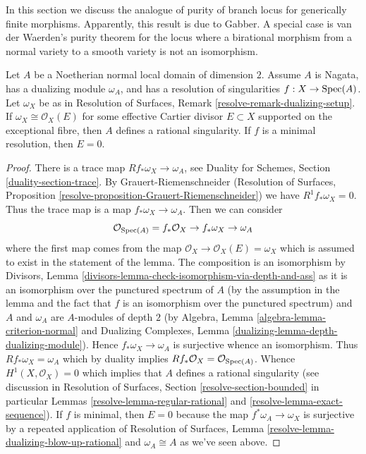 \noindent
In this section we discuss the analogue of purity of branch locus for
generically finite morphisms. Apparently, this result is due to Gabber.
A special case is van der Waerden's purity theorem for the locus where
a birational morphism from a normal variety to a smooth variety is not
an isomorphism.

\begin{lemma}
\label{lemma-characterize-rational-singularity}
Let $A$ be a Noetherian normal local domain of dimension $2$.
Assume $A$ is Nagata, has a dualizing module $\omega_A$, and has a
resolution of singularities $f : X \to \mathop{\mathrm{Spec}}(A)$.
Let $\omega_X$ be as in Resolution of Surfaces,
Remark \ref{resolve-remark-dualizing-setup}.
If $\omega_X \cong \mathcal{O}_X(E)$ for some effective
Cartier divisor $E \subset X$ supported on the exceptional
fibre, then $A$ defines a rational singularity.
If $f$ is a minimal resolution, then $E = 0$.
\end{lemma}

\begin{proof}
There is a trace map $Rf_*\omega_X \to \omega_A$, see
Duality for Schemes, Section \ref{duality-section-trace}.
By Grauert-Riemenschneider
(Resolution of Surfaces,
Proposition \ref{resolve-proposition-Grauert-Riemenschneider})
we have $R^1f_*\omega_X = 0$.
Thus the trace map is a map $f_*\omega_X \to \omega_A$.
Then we can consider
$$
\mathcal{O}_{\mathop{\mathrm{Spec}}(A)} = f_*\mathcal{O}_X \to f_*\omega_X \to \omega_A
$$
where the first map comes from the map
$\mathcal{O}_X \to \mathcal{O}_X(E) = \omega_X$ which is
assumed to exist in the statement of the lemma.
The composition is an isomorphism by Divisors, Lemma
\ref{divisors-lemma-check-isomorphism-via-depth-and-ass}
as it is an isomorphism over the punctured spectrum of $A$
(by the assumption in the lemma and the fact that $f$ is an isomorphism
over the punctured spectrum) and $A$ and $\omega_A$
are $A$-modules of depth $2$ (by
Algebra, Lemma \ref{algebra-lemma-criterion-normal} and
Dualizing Complexes, Lemma \ref{dualizing-lemma-depth-dualizing-module}).
Hence $f_*\omega_X \to \omega_A$ is surjective whence an isomorphism.
Thus $Rf_*\omega_X = \omega_A$ which by duality implies
$Rf_*\mathcal{O}_X = \mathcal{O}_{\mathop{\mathrm{Spec}}(A)}$.
Whence $H^1(X, \mathcal{O}_X) = 0$ which implies that $A$
defines a rational singularity (see discussion in
Resolution of Surfaces, Section
\ref{resolve-section-bounded} in particular
Lemmas \ref{resolve-lemma-regular-rational} and
\ref{resolve-lemma-exact-sequence}).
If $f$ is minimal, then $E = 0$ because the map
$f^*\omega_A \to \omega_X$ is surjective by
a repeated application of Resolution of Surfaces, Lemma
\ref{resolve-lemma-dualizing-blow-up-rational}
and $\omega_A \cong A$ as we've seen above.
\end{proof}

